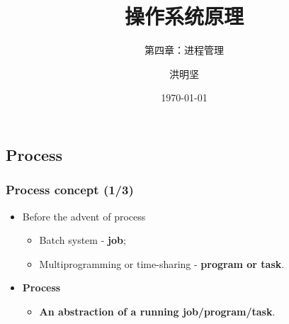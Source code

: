 \documentclass[CJKutf8,xcolor=pdftex,dvipsnames,table]{beamer}
\begin{document}
\begin{CJK*}{UTF8}{song}

  \title{ 操作系统原理}
  \subtitle{ 第四章：进程管理}
	\author{ 洪明坚}
  \date{\today}


  \frame{\titlepage}


  \section{Process}
  
  \begin{frame}
  \frametitle{Process concept (1/3)} \pause
  \begin{itemize}
  \item{Before the advent of process} \pause
    \begin{itemize}
    \item{Batch system \pause - \textbf{job};} \pause
    \item{Multiprogramming or time-sharing \pause - \textbf{program or task}.} \pause
    \end{itemize}
  \item{\textbf{Process}} \pause
    \begin{itemize}
    \item{\textbf{An abstraction of a running job/program/task}.}
    \end{itemize}
  \end{itemize}
  \end{frame}


\end{CJK*}
\end{document}
